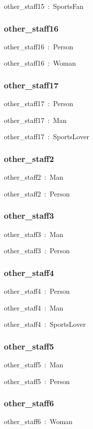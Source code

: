 \documentclass{article}
\begin{document}
other\_staff15~:~SportsFan

\subsubsection*{other\_staff16}

other\_staff16~:~Person

other\_staff16~:~Woman

\subsubsection*{other\_staff17}

other\_staff17~:~Person

other\_staff17~:~Man

other\_staff17~:~SportsLover

\subsubsection*{other\_staff2}

other\_staff2~:~Man

other\_staff2~:~Person

\subsubsection*{other\_staff3}

other\_staff3~:~Man

other\_staff3~:~Person

\subsubsection*{other\_staff4}

other\_staff4~:~Person

other\_staff4~:~Man

other\_staff4~:~SportsLover

\subsubsection*{other\_staff5}

other\_staff5~:~Man

other\_staff5~:~Person

\subsubsection*{other\_staff6}

other\_staff6~:~Woman
\end{document}
